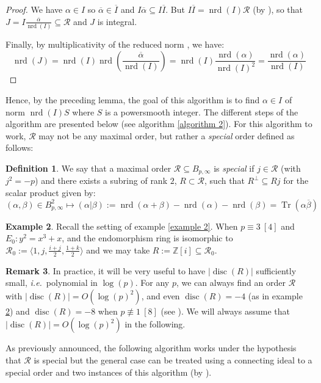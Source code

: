 \documentclass[a4paper,10pt]{report}
\theoremstyle{definition}
\newtheorem{definition}{Definition}[chapter]
\theoremstyle{plain}
\theoremstyle{definition}
\newtheorem{remark}[definition]{Remark}
\newtheorem{example}[definition]{Example}
\newcommand{\ie}{\emph{i.e.}\ }
\newcommand{\Z}{\mathbb{Z}}
\newcommand{\m}[1]{\mathcal{#1}}
\renewcommand{\(}{\left(}
\renewcommand{\)}{\right)}
\DeclareMathOperator{\Tr}{Tr}
\DeclareMathOperator{\disc}{disc}
\DeclareMathOperator{\nrd}{nrd}
\begin{document}
\begin{proof}
We have $\alpha\in I$ so $\overline{\alpha}\in \overline{I}$ and $I\overline{\alpha}\subseteq I\overline{I}$. But $I\overline{I}=\nrd(I)\m{R}$ (by \cite[16.6.14]{Voight}), so that $J=I\frac{\overline{\alpha}}{\nrd(I)}\subseteq \m{R}$ and $J$ is integral. 

Finally, by multiplicativity of the reduced norm \cite[lemma 16.3.7]{Voight}, we have:
\[\nrd(J)=\nrd(I)\nrd\(\frac{\overline{\alpha}}{\nrd(I)}\)=\nrd(I)\frac{\nrd(\alpha)}{\nrd(I)^2}=\frac{\nrd(\alpha)}{\nrd(I)}\]
\end{proof}

Hence, by the preceding lemma, the goal of this algorithm is to find $\alpha\in I$ of norm $\nrd(I)S$ where $S$ is a powersmooth integer.  The different steps of the algorithm are presented below (see algorithm \ref{algorithm 2}). For this algorithm to work, $\m{R}$ may not be any maximal order, but rather a \emph{special} order defined as follows:

\begin{definition}\label{definition 2}
We say that a maximal order $\m{R}\subseteq B_{p,\infty}$ is \emph{special} if $j\in \m{R}$ (with $j^2=-p$) and there exists a subring of rank $2$, $R\subset\m{R}$, such that $R^\bot\subseteq Rj$ for the scalar product given by:
\[(\alpha,\beta)\in B_{p,\infty}^2\longmapsto (\alpha|\beta):=\nrd(\alpha+\beta)-\nrd(\alpha)-\nrd(\beta)=\Tr(\alpha\overline{\beta})\]
\end{definition}

\begin{example}\label{example 3}
Recall the setting of example \ref{example 2}. When $p\equiv 3 \ [4]$ and $E_0: y^2=x^3+x$,  and the endomorphism ring is isomorphic to $\m{R}_0:= \langle 1,j, \frac{i+j}{2},\frac{1+k}{2}\rangle$ and we may take $R:=\Z[i]\subseteq\m{R}_0$.
\end{example}

\begin{remark}
In practice, it will be very useful to have $|\disc(R)|$ sufficiently small, \ie  polynomial in $\log(p)$.  For any $p$, we can always find an order $\m{R}$ with $|\disc(R)|=O(\log(p)^2)$, and even $\disc(R)=-4$ (as in example \ref{example 3}) and $\disc(R)=-8$ when $p\not\equiv 1 \ [8]$ (see \cite[section 2.3]{KLPT}). We will always assume that $|\disc(R)|=O(\log(p)^2)$ in the following.
\end{remark}

As previously announced, the following algorithm works under the hypothesis that $\m{R}$ is special but the general case can be treated using a connecting ideal to a special order and two instances of this algorithm (by \cite[theorem 9]{KLPT}).
\end{document}
